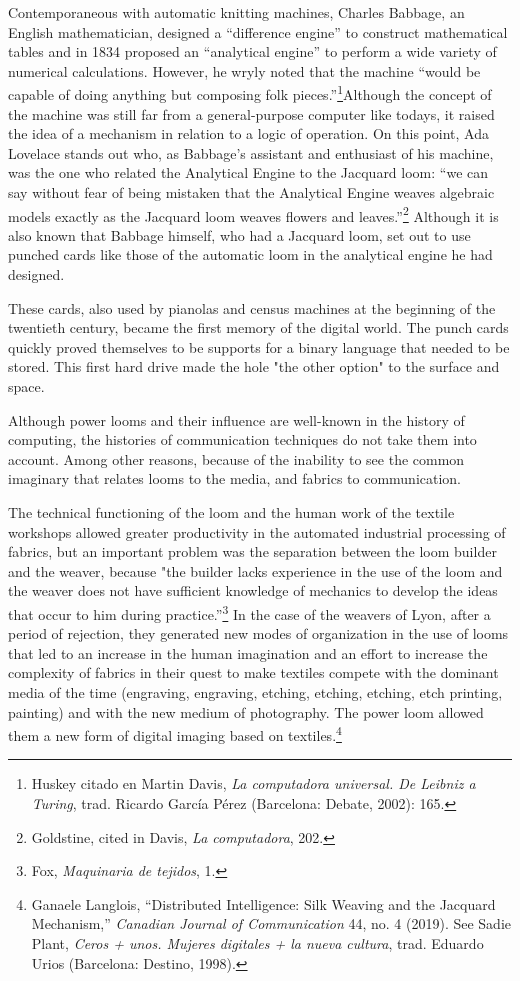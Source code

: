 \documentclass{tufte-handout}
\begin{document}
Contemporaneous with automatic knitting machines, Charles Babbage, an
English mathematician, designed a ``difference engine'' to construct
mathematical tables and in 1834 proposed an ``analytical engine'' to
perform a wide variety of numerical calculations. However, he wryly
noted that the machine ``would be capable of doing anything but
composing folk pieces.''\footnote{Huskey citado en Martin Davis,
  \emph{La computadora universal. De Leibniz a Turing}, trad. Ricardo
  García Pérez (Barcelona: Debate, 2002): 165.}Although the concept of
the machine was still far from a general-purpose computer like
today\textquotesingle s, it raised the idea of a mechanism in relation
to a logic of operation. On this point, Ada Lovelace stands out who, as
Babbage's assistant and enthusiast of his machine, was the one who
related the Analytical Engine to the Jacquard loom: ``we can say without
fear of being mistaken that the Analytical Engine weaves algebraic
models exactly as the Jacquard loom weaves flowers and
leaves.''\footnote{Goldstine, cited in Davis, \emph{La computadora},
  202.} Although it is also known that Babbage himself, who had a
Jacquard loom, set out to use punched cards like those of the automatic
loom in the analytical engine he had designed.

These cards, also used by pianolas and census machines at the beginning
of the twentieth century, became the first memory of the digital world.
The punch cards quickly proved themselves to be supports for a binary
language that needed to be stored. This first hard drive made the hole
"the other option" to the surface and space.

Although power looms and their influence are well-known in the history
of computing, the histories of communication techniques do not take them
into account. Among other reasons, because of the inability to see the
common imaginary that relates looms to the media, and fabrics to
communication.

The technical functioning of the loom and the human work of the textile
workshops allowed greater productivity in the automated industrial
processing of fabrics, but an important problem was the separation
between the loom builder and the weaver, because "the builder lacks
experience in the use of the loom and the weaver does not have
sufficient knowledge of mechanics to develop the ideas that occur to him
during practice.''\footnote{Fox, \emph{Maquinaria de tejidos}, 1.} In
the case of the weavers of Lyon, after a period of rejection, they
generated new modes of organization in the use of looms that led to an
increase in the human imagination and an effort to increase the
complexity of fabrics in their quest to make textiles compete with the
dominant media of the time (engraving, engraving, etching, etching,
etching, etch printing, painting) and with the new medium of
photography. The power loom allowed them a new form of digital imaging
based on textiles.\footnote{Ganaele Langlois, ``Distributed
  Intelligence: Silk Weaving and the Jacquard Mechanism,''
  \emph{Canadian Journal of Communication} 44, no. 4 (2019). See Sadie
  Plant, \emph{Ceros + unos. Mujeres digitales + la nueva cultura},
  trad. Eduardo Urios (Barcelona: Destino, 1998).}
\end{document}
